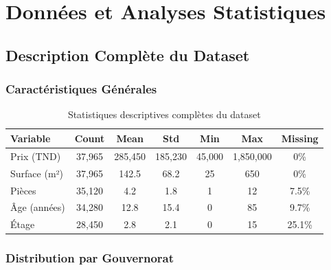 
\chapter{Données et Analyses Statistiques}
\label{annexe:donnees}

\section{Description Complète du Dataset}

\subsection{Caractéristiques Générales}

\begin{table}[H]
\centering
\caption{Statistiques descriptives complètes du dataset}
\begin{tabular}{|l|c|c|c|c|c|c|}
\hline
\textbf{Variable} & \textbf{Count} & \textbf{Mean} & \textbf{Std} & \textbf{Min} & \textbf{Max} & \textbf{Missing} \\
\hline
Prix (TND) & 37,965 & 285,450 & 185,230 & 45,000 & 1,850,000 & 0\% \\
Surface (m²) & 37,965 & 142.5 & 68.2 & 25 & 650 & 0\% \\
Pièces & 35,120 & 4.2 & 1.8 & 1 & 12 & 7.5\% \\
Âge (années) & 34,280 & 12.8 & 15.4 & 0 & 85 & 9.7\% \\
Étage & 28,450 & 2.8 & 2.1 & 0 & 15 & 25.1\% \\
\hline
\end{tabular}
\end{table}

\subsection{Distribution par Gouvernorat}


